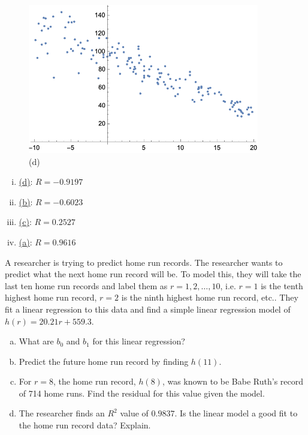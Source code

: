 \documentclass[11pt,letterpaper]{article}
\begin{document}
\begin{figure}[!ht]
\begin{minipage}{0.45\textwidth}
	   \caption*{(c)}
	\end{minipage}
	\begin{minipage}{0.45\textwidth}
	   \centering
	   \includegraphics[width=0.9\textwidth]{reg4.png}
	   \caption*{(d)}
	\end{minipage}
	\end{figure}

\begin{enumerate}[(i)]
\item\underline{\hspace{0.5cm}(d)\hspace{0.5cm}}: $R= -0.9197$
\item\underline{\hspace{0.5cm}(b)\hspace{0.5cm}}: $R= -0.6023$
\item\underline{\hspace{0.5cm}(c)\hspace{0.5cm}}: $R= 0.2527$
\item\underline{\hspace{0.5cm}(a)\hspace{0.5cm}}: $R= 0.9616$
\end{enumerate} 



\newpage



 A researcher is trying to predict home run records. The researcher wants to predict what the next home run record will be. To model this, they will take the last ten home run records and label them as $r= 1, 2, \ldots, 10$, i.e. $r= 1$ is the tenth highest home run record, $r= 2$ is the ninth highest home run record, etc.. They fit a linear regression to this data and find a simple linear regression model of $h(r)= 20.21r + 559.3$. 
	\begin{enumerate}[(a)]
	\item What are $b_0$ and $b_1$ for this linear regression?
	\item Predict the future home run record by finding $h(11)$.
	\item For $r= 8$, the home run record, $h(8)$, was known to be Babe Ruth's record of 714 home runs. Find the residual for this value given the model.
	\item The researcher finds an $R^2$ value of $0.9837$. Is the linear model a good fit to the home run record data? Explain. 
	\end{enumerate} \pspace
\end{document}
